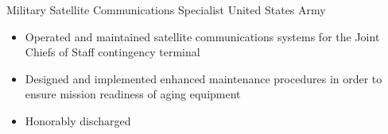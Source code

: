 \cventry
    {Military}
    {Satellite Communications Specialist}
    {United States Army}
    {}
    {}
    {\begin{itemize}
        \item Operated and maintained satellite communications systems for the Joint Chiefs of Staff
        contingency terminal
        \item Designed and implemented enhanced maintenance procedures in order to ensure mission
        readiness of aging equipment
        \item Honorably discharged
    \end{itemize}}